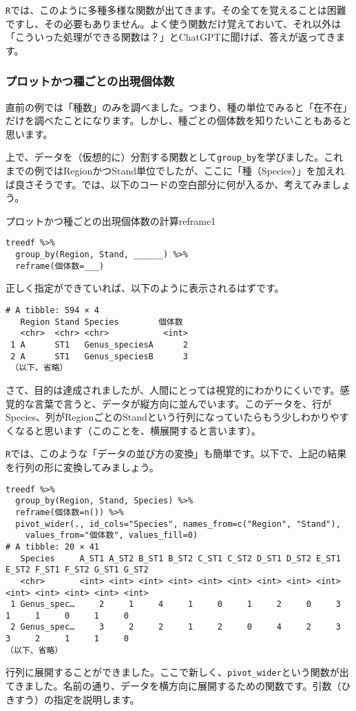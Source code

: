 \texttt{R}では、このように多種多様な関数が出てきます。その全てを覚えることは困難ですし、その必要もありません。よく使う関数だけ覚えておいて、それ以外は「こういった処理ができる関数は？」とChatGPTに聞けば、答えが返ってきます。

    \subsubsection{プロットかつ種ごとの出現個体数}
直前の例では「種数」のみを調べました。つまり、種の単位でみると「在不在」だけを調べたことになります。しかし、種ごとの個体数を知りたいこともあると思います。

上で、データを（仮想的に）分割する関数として\verb|group_by|を学びました。これまでの例ではRegionかつStand単位でしたが、ここに「種（Species）」を加えれば良さそうです。では、以下のコードの空白部分に何が入るか、考えてみましょう。
\begin{exercise}{プロットかつ種ごとの出現個体数の計算}{reframe1}
\begin{verbatim}
treedf %>%
  group_by(Region, Stand, ______) %>%
  reframe(個体数=___)
\end{verbatim}
\end{exercise}

正しく指定ができていれば、以下のように表示されるはずです。

\begin{verbatim}
# A tibble: 594 × 4
   Region Stand Species        個体数
   <chr>  <chr> <chr>           <int>
 1 A      ST1   Genus_speciesA      2
 2 A      ST1   Genus_speciesB      3
 （以下、省略）
\end{verbatim}

さて、目的は達成されましたが、人間にとっては視覚的にわかりにくいです。感覚的な言葉で言うと、データが縦方向に並んでいます。このデータを、行がSpecies、列がRegionごとのStandという行列になっていたらもう少しわかりやすくなると思います（このことを、横展開すると言います）。

\texttt{R}では、このような「データの並び方の変換」も簡単です。以下で、上記の結果を行列の形に変換してみましょう。

\begin{verbatim}
treedf %>%
  group_by(Region, Stand, Species) %>%
  reframe(個体数=n()) %>%
  pivot_wider(., id_cols="Species", names_from=c("Region", "Stand"),
    values_from="個体数", values_fill=0)
# A tibble: 20 × 41
   Species     A_ST1 A_ST2 B_ST1 B_ST2 C_ST1 C_ST2 D_ST1 D_ST2 E_ST1 E_ST2 F_ST1 F_ST2 G_ST1 G_ST2
   <chr>       <int> <int> <int> <int> <int> <int> <int> <int> <int> <int> <int> <int> <int> <int>
 1 Genus_spec…     2     1     4     1     0     1     2     0     3     1     1     0     1     0
 2 Genus_spec…     3     2     2     1     2     0     4     2     3     3     2     1     1     0
（以下、省略）
\end{verbatim}
行列に展開することができました。ここで新しく、\verb|pivot_wider|という関数が出てきました。名前の通り、データを横方向に展開するための関数です。引数（ひきすう）の指定を説明します。

